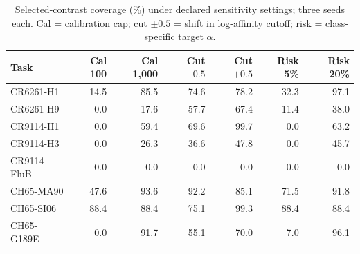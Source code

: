 \begin{table}[t]
\centering\footnotesize
\caption{Selected-contrast coverage (\%) under declared sensitivity settings; three seeds each. Cal = calibration cap; cut $\pm0.5$ = shift in log-affinity cutoff; risk = class-specific target $\alpha$.}
\setlength{\tabcolsep}{4pt}
\begin{tabular}{lrrrrrr}
\toprule
Task & Cal 100 & Cal 1,000 & Cut $-0.5$ & Cut $+0.5$ & Risk 5\% & Risk 20\% \\
\midrule
CR6261-H1 & 14.5 & 85.5 & 74.6 & 78.2 & 32.3 & 97.1 \\
CR6261-H9 & 0.0 & 17.6 & 57.7 & 67.4 & 11.4 & 38.0 \\
CR9114-H1 & 0.0 & 59.4 & 69.6 & 99.7 & 0.0 & 63.2 \\
CR9114-H3 & 0.0 & 26.3 & 36.6 & 47.8 & 0.0 & 45.7 \\
CR9114-FluB & 0.0 & 0.0 & 0.0 & 0.0 & 0.0 & 0.0 \\
CH65-MA90 & 47.6 & 93.6 & 92.2 & 85.1 & 71.5 & 91.8 \\
CH65-SI06 & 88.4 & 88.4 & 75.1 & 99.3 & 88.4 & 88.4 \\
CH65-G189E & 0.0 & 91.7 & 55.1 & 70.0 & 7.0 & 96.1 \\
\bottomrule
\end{tabular}
\end{table}
